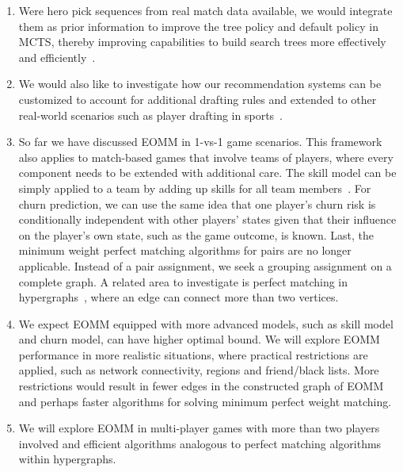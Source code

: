 \begin{enumerate}
\item Were hero pick sequences from real match data available, we would integrate them as prior information to improve the tree policy and default policy in MCTS, thereby improving capabilities to build search trees more effectively and efficiently~\cite{gelly2007combining,chaslot2009adding}. 

\item We would also like to investigate how our recommendation systems can be customized to account for additional drafting rules and extended to other real-world scenarios such as player drafting in sports~\cite{staw1995sunk}. 


\item So far we have discussed EOMM in 1-vs-1 game scenarios. This framework also applies to match-based games that involve teams of players, where every component needs to be extended with additional care. The skill model can be simply applied to a team by adding up skills for all team members~\cite{herbrich:trueskill}. For churn prediction, we can use the same idea that one player's churn risk is conditionally independent with other players' states given that their influence on the player's own state, such as the game outcome, is known. Last, the minimum weight perfect matching algorithms for pairs are no longer applicable. Instead of a pair assignment, we seek a grouping assignment on a complete graph. A related area to investigate is perfect matching in hypergraphs~\cite{berge1984hypergraphs}, where an edge can connect more than two vertices. 


\item We expect EOMM equipped with more advanced models, such as skill model and churn model, can have higher optimal bound. We will explore EOMM performance in more realistic situations, where practical restrictions are applied, such as network connectivity, regions and friend/black lists. More restrictions would result in fewer edges in the constructed graph of EOMM and perhaps faster algorithms for solving minimum perfect weight matching. 

\item We will explore EOMM in multi-player games with more than two players involved and efficient algorithms analogous to perfect matching algorithms within hypergraphs.
\end{enumerate}

